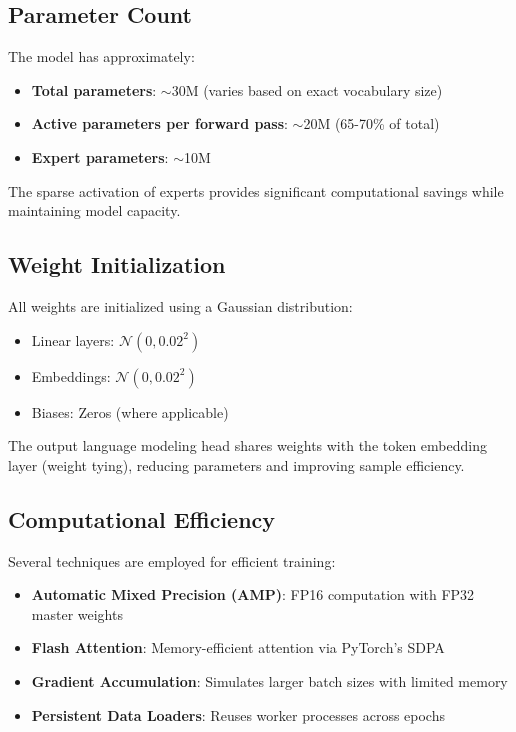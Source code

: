 \documentclass[11pt,a4paper]{article}
\begin{document}
\subsection{Parameter Count}

The model has approximately:
\begin{itemize}
    \item \textbf{Total parameters}: $\sim$30M (varies based on exact vocabulary size)
    \item \textbf{Active parameters per forward pass}: $\sim$20M (65-70\% of total)
    \item \textbf{Expert parameters}: $\sim$10M
\end{itemize}

The sparse activation of experts provides significant computational savings while maintaining model capacity.

\subsection{Weight Initialization}

All weights are initialized using a Gaussian distribution:

\begin{itemize}
    \item Linear layers: $\mathcal{N}(0, 0.02^2)$
    \item Embeddings: $\mathcal{N}(0, 0.02^2)$
    \item Biases: Zeros (where applicable)
\end{itemize}

The output language modeling head shares weights with the token embedding layer (weight tying), reducing parameters and improving sample efficiency.

\subsection{Computational Efficiency}

Several techniques are employed for efficient training:

\begin{itemize}
    \item \textbf{Automatic Mixed Precision (AMP)}: FP16 computation with FP32 master weights
    \item \textbf{Flash Attention}: Memory-efficient attention via PyTorch's SDPA
    \item \textbf{Gradient Accumulation}: Simulates larger batch sizes with limited memory
    \item \textbf{Persistent Data Loaders}: Reuses worker processes across epochs
\end{itemize}
\end{document}
